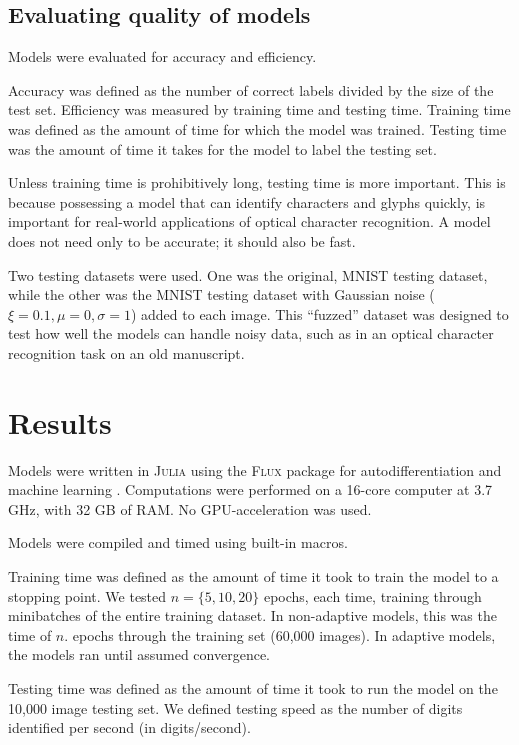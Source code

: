 \documentclass{article}
\begin{document}
\subsection{Evaluating quality of models}

Models were evaluated for accuracy and efficiency.

Accuracy was defined as the number of correct labels divided by the size of the test set.
Efficiency was measured by training time and testing time.
Training time was defined as the amount of time for which the model was trained.
Testing time was the amount of time it takes for the model to label the testing set.

Unless training time is prohibitively long, testing time is more important.
This is because possessing a model that can identify characters and glyphs quickly,
is important for real-world applications of optical character recognition.
A model does not need only to be accurate; it should also be fast.

Two testing datasets were used.
One was the original, MNIST testing dataset, while
the other was the MNIST testing dataset with Gaussian noise ($\xi = 0.1, \mu = 0, \sigma = 1$) added to each image.
This ``fuzzed'' dataset was designed to test how well the models can handle noisy data,
such as in an optical character recognition task on an old manuscript.

\section{Results}

Models were written in \textsc{Julia} \citep{bezansonJuliaFreshApproach2017}
using the \textsc{Flux} package for autodifferentiation and machine learning \citep{innesFluxElegantMachine2018}.
Computations were performed on a 16-core computer at 3.7 GHz,
with 32 GB of RAM.
No GPU-acceleration was used.

Models were compiled and timed using built-in macros.

Training time was defined as the amount of time it took to train the model to a stopping point.
We tested $n = \{ 5, 10, 20 \}$ epochs, each time, training through minibatches of the entire training dataset.
In non-adaptive models, this was the time of $n$. epochs through the training set (60,000 images).
In adaptive models, the models ran until assumed convergence.

Testing time was defined as the amount of time it took to run the model on the 10,000 image testing set.
We defined testing speed as the number of digits identified per second (in digits/second).
\end{document}
